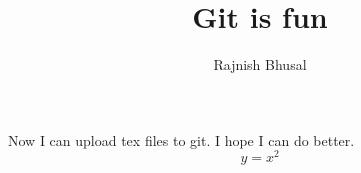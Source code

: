 \documentclass[10pt]{article}
\author{Rajnish Bhusal}
\title{Git is fun}
\begin{document}
	\maketitle
	Now I can upload tex files to git.
	I hope I can do better.
	\begin{equation}
	y = x^2
	\end{equation}
\end{document}

